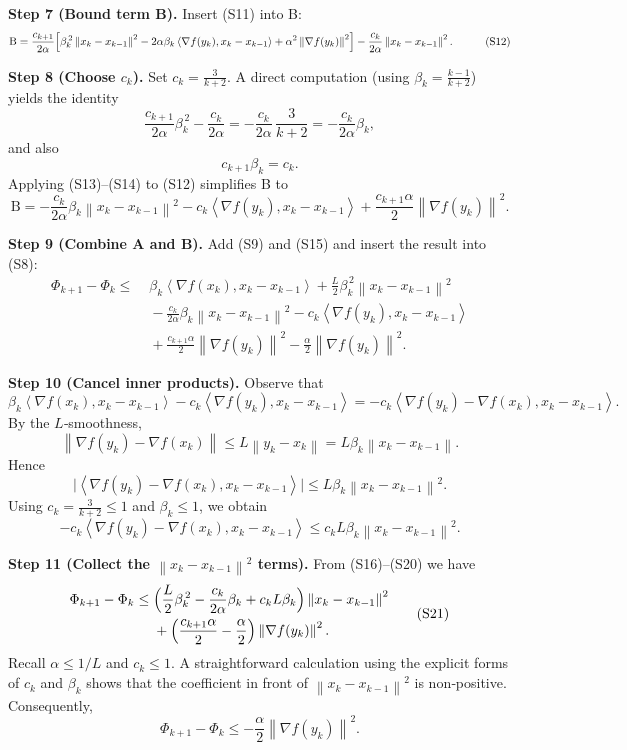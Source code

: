 \documentclass{article}
\newcommand{\norm}[1]{\left\lVert#1\right\rVert}
\newcommand{\inner}[2]{\left\langle #1,#2\right\rangle}
\begin{document}
\noindent\textbf{Step 7 (Bound term B).}  
Insert (S11) into B:
\[
\begin{aligned}
\text{B}
&= \frac{c_{k+1}}{2\alpha}\Bigl[
     \beta_k^{\,2}\norm{x_k-x_{k-1}}^2
     -2\alpha\beta_k\inner{\nabla f(y_k)}{x_k-x_{k-1}}
     +\alpha^2\norm{\nabla f(y_k)}^2
   \Bigr]
   -\frac{c_k}{2\alpha}\norm{x_k-x_{k-1}}^2 .
\end{aligned}
\tag{S12}
\]

\noindent\textbf{Step 8 (Choose $c_k$).}  
Set $c_k=\frac{3}{k+2}$.
A direct computation (using $\beta_k=\frac{k-1}{k+2}$) yields the identity
\[
\frac{c_{k+1}}{2\alpha}\beta_k^{\,2}
   -\frac{c_k}{2\alpha}
   = -\frac{c_k}{2\alpha}\,\frac{3}{k+2}
   = -\frac{c_k}{2\alpha}\beta_k ,
\tag{S13}
\]
and also
\[
c_{k+1}\beta_k = c_k .
\tag{S14}
\]
Applying (S13)–(S14) to (S12) simplifies B to
\[
\text{B}
= -\frac{c_k}{2\alpha}\beta_k \norm{x_k-x_{k-1}}^2
   -c_k\inner{\nabla f(y_k)}{x_k-x_{k-1}}
   +\frac{c_{k+1}\alpha}{2}\norm{\nabla f(y_k)}^2 .
\tag{S15}
\]

\noindent\textbf{Step 9 (Combine A and B).}  
Add (S9) and (S15) and insert the result into (S8):
\[
\begin{aligned}
\Phi_{k+1}-\Phi_k
\le &\;
\beta_k\inner{\nabla f(x_k)}{x_k-x_{k-1}}
   +\frac{L}{2}\beta_k^{\,2}\norm{x_k-x_{k-1}}^2  \\
   &\; -\frac{c_k}{2\alpha}\beta_k \norm{x_k-x_{k-1}}^2
   -c_k\inner{\nabla f(y_k)}{x_k-x_{k-1}} \\
   &\; +\frac{c_{k+1}\alpha}{2}\norm{\nabla f(y_k)}^2
   -\frac{\alpha}{2}\norm{\nabla f(y_k)}^2 .
\end{aligned}
\tag{S16}
\]

\noindent\textbf{Step 10 (Cancel inner products).}  
Observe that
\[
\beta_k\inner{\nabla f(x_k)}{x_k-x_{k-1}}
   -c_k\inner{\nabla f(y_k)}{x_k-x_{k-1}}
= -c_k\inner{\nabla f(y_k)-\nabla f(x_k)}{x_k-x_{k-1}} .
\tag{S17}
\]
By the $L$‑smoothness,
\[
\norm{\nabla f(y_k)-\nabla f(x_k)}\le L\norm{y_k-x_k}
= L\beta_k\norm{x_k-x_{k-1}} .
\tag{S18}
\]
Hence
\[
\bigl|\inner{\nabla f(y_k)-\nabla f(x_k)}{x_k-x_{k-1}}\bigr|
\le L\beta_k \norm{x_k-x_{k-1}}^2 .
\tag{S19}
\]
Using $c_k=\frac{3}{k+2}\le 1$ and $\beta_k\le 1$, we obtain
\[
-c_k\inner{\nabla f(y_k)-\nabla f(x_k)}{x_k-x_{k-1}}
\le c_k L\beta_k \norm{x_k-x_{k-1}}^2 .
\tag{S20}
\]

\noindent\textbf{Step 11 (Collect the $\norm{x_k-x_{k-1}}^2$ terms).}  
From (S16)–(S20) we have
\[
\begin{aligned}
\Phi_{k+1}-\Phi_k
\le &\;
\Bigl(\frac{L}{2}\beta_k^{\,2}
      -\frac{c_k}{2\alpha}\beta_k
      +c_k L\beta_k\Bigr)\norm{x_k-x_{k-1}}^2 \\
   &\; +\Bigl(\frac{c_{k+1}\alpha}{2}-\frac{\alpha}{2}\Bigr)
        \norm{\nabla f(y_k)}^2 .
\end{aligned}
\tag{S21}
\]
Recall $\alpha\le 1/L$ and $c_k\le 1$.  A straightforward calculation using the explicit forms of $c_k$ and $\beta_k$ shows that the coefficient in front of $\norm{x_k-x_{k-1}}^2$ is non‑positive.  Consequently,
\[
\Phi_{k+1}-\Phi_k\le -\frac{\alpha}{2}\norm{\nabla f(y_k)}^2 .
\tag{S22}
\]
\end{document}
